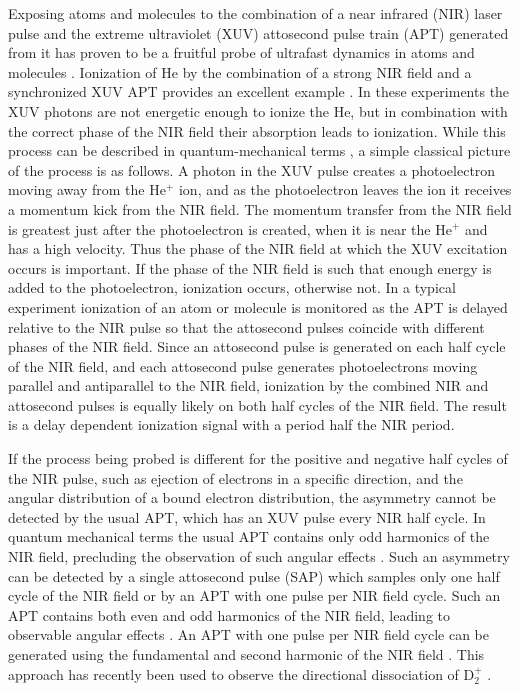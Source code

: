 \documentclass[aps,pra,reprint,groupedaddress]{revtex4-1}
\begin{document}
Exposing atoms and molecules to the combination of a near infrared (NIR) laser pulse and the extreme ultraviolet (XUV) attosecond pulse train (APT) generated from it has proven to be a fruitful probe of ultrafast dynamics in atoms and molecules \cite{Krausz}. Ionization of He by the combination of a strong NIR field and a synchronized XUV APT provides an excellent example \cite{Johnsson, Ranitovic, Tong}.  In these experiments the XUV photons are not energetic enough to ionize the He, but in combination with the correct phase of the NIR field their absorption leads to ionization. While this process can be described in quantum-mechanical terms \cite{Johnsson, Ranitovic, Tong, Zhong}, a simple classical picture of the process is as follows. A photon in the XUV pulse creates a photoelectron moving away from the He$^+$ ion, and as the photoelectron leaves the ion it receives a momentum kick from the NIR field. The momentum transfer from the NIR field is greatest just after the photoelectron is created, when it is near the He$^+$ and has a high velocity. Thus the phase of the NIR field at which the XUV excitation occurs is important. If the phase of the NIR field is such that enough energy is added to the photoelectron, ionization occurs, otherwise not. In a typical experiment ionization of an atom or molecule is monitored as the APT is delayed relative to the NIR pulse so that the attosecond pulses coincide with different phases of the NIR field. Since an attosecond  pulse is generated on each half cycle of the NIR field, and each attosecond pulse generates photoelectrons moving parallel and antiparallel to the NIR field, ionization by the combined NIR and attosecond pulses is equally likely on both half cycles of the NIR field. The result is a delay dependent ionization signal with a period half the NIR period.

If the process being probed is different for the positive and negative half cycles of the NIR pulse, such as ejection of electrons in a specific direction, and the angular distribution of a bound electron distribution, the asymmetry cannot be detected by the usual APT, which has an XUV pulse every NIR half cycle. In quantum mechanical terms the usual APT contains only odd harmonics of the NIR field, precluding the observation of such angular effects \cite{Zhong}. Such an asymmetry can be detected by a single attosecond pulse (SAP) which samples only one half cycle of the NIR field or by an APT with one pulse per NIR field cycle. Such an APT contains both even and odd harmonics of the NIR field, leading to observable angular effects \cite{Zhong}. An APT with one pulse per NIR field cycle can be generated using the fundamental and second harmonic of the NIR field \cite{Mauritsson}. This approach has recently been used to observe the directional dissociation of D$_2^+$ \cite{Singh}.
\end{document}
